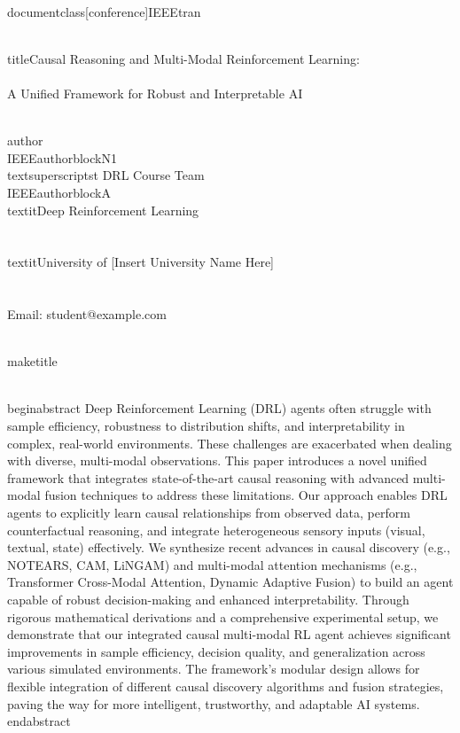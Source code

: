 \\documentclass[conference]{IEEEtran}
\begin{document}
\\title{Causal Reasoning and Multi-Modal Reinforcement Learning: \\\\ A Unified Framework for Robust and Interpretable AI}

\\author{\\IEEEauthorblockN{1\\textsuperscript{st} DRL Course Team}
\\IEEEauthorblockA{\\textit{Deep Reinforcement Learning} \\\\
\\textit{University of [Insert University Name Here]}\\
[Insert City, Country]} \\\\
Email: student@example.com} %

\\maketitle

\\begin{abstract}
Deep Reinforcement Learning (DRL) agents often struggle with sample efficiency, robustness to distribution shifts, and interpretability in complex, real-world environments. These challenges are exacerbated when dealing with diverse, multi-modal observations. This paper introduces a novel unified framework that integrates state-of-the-art causal reasoning with advanced multi-modal fusion techniques to address these limitations. Our approach enables DRL agents to explicitly learn causal relationships from observed data, perform counterfactual reasoning, and integrate heterogeneous sensory inputs (visual, textual, state) effectively. We synthesize recent advances in causal discovery (e.g., NOTEARS, CAM, LiNGAM) and multi-modal attention mechanisms (e.g., Transformer Cross-Modal Attention, Dynamic Adaptive Fusion) to build an agent capable of robust decision-making and enhanced interpretability. Through rigorous mathematical derivations and a comprehensive experimental setup, we demonstrate that our integrated causal multi-modal RL agent achieves significant improvements in sample efficiency, decision quality, and generalization across various simulated environments. The framework's modular design allows for flexible integration of different causal discovery algorithms and fusion strategies, paving the way for more intelligent, trustworthy, and adaptable AI systems.
\\end{abstract}
\end{document}
